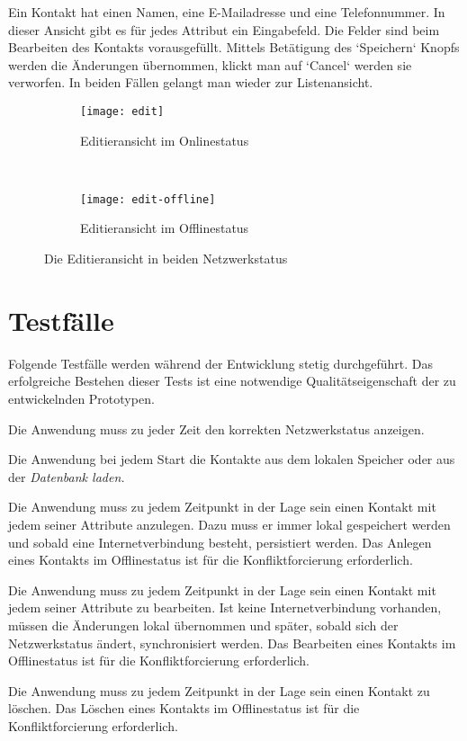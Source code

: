 Ein Kontakt hat einen Namen, eine E-Mailadresse und eine Telefonnummer. In dieser Ansicht gibt es für jedes Attribut ein Eingabefeld. Die Felder sind beim Bearbeiten des Kontakts vorausgefüllt. Mittels Betätigung des `Speichern` Knopfs werden die Änderungen übernommen, klickt man auf `Cancel` werden sie verworfen. In beiden Fällen gelangt man wieder zur Listenansicht.
\begin{figure}[H]
  \centering
  \begin{subfigure}[t]{0.49\textwidth}
          \texttt{[image: edit]}
          \caption{Editieransicht im Onlinestatus}
          \label{fig:edit-online}
  \end{subfigure}
  ~ 
  \begin{subfigure}[t]{0.49\textwidth}
          \texttt{[image: edit-offline]}
          \caption{Editieransicht im Offlinestatus}
          \label{fig:edit-offline}
  \end{subfigure}
  \grayRule
  \caption{Die Editieransicht in beiden Netzwerkstatus}
  \label{fig:edit}
\end{figure}
%
%
\section{Testfälle}
Folgende Testfälle werden während der Entwicklung stetig durchgeführt. Das erfolgreiche Bestehen dieser Tests ist eine notwendige Qualitätseigenschaft der zu entwickelnden Prototypen.
\begin{description}[leftmargin=0.7cm,style=nextline]
\item[Netzwerkstatus:] 
Die Anwendung muss zu jeder Zeit den korrekten Netzwerkstatus anzeigen.\\
\item[Kontakte lesen:] 
Die Anwendung bei jedem Start die Kontakte aus dem lokalen Speicher oder aus der \it{Datenbank} laden.\\
\item[Kontakt anlegen:] 
Die Anwendung muss zu jedem Zeitpunkt in der Lage sein einen Kontakt mit jedem seiner Attribute anzulegen. Dazu muss er immer lokal gespeichert werden und sobald eine Internetverbindung besteht, persistiert werden.
Das Anlegen eines Kontakts im Offlinestatus ist für die Konfliktforcierung erforderlich.\\
\item[Kontakt bearbeiten:] 
Die Anwendung muss zu jedem Zeitpunkt in der Lage sein einen Kontakt mit jedem seiner Attribute zu bearbeiten. Ist keine Internetverbindung vorhanden, müssen die Änderungen lokal übernommen und später, sobald sich der Netzwerkstatus ändert, synchronisiert werden.
Das Bearbeiten eines Kontakts im Offlinestatus ist für die Konfliktforcierung erforderlich.\\
\item[Kontakt löschen:] 
Die Anwendung muss zu jedem Zeitpunkt in der Lage sein einen Kontakt zu löschen.
Das Löschen eines Kontakts im Offlinestatus ist für die Konfliktforcierung erforderlich.\\
\end{description}